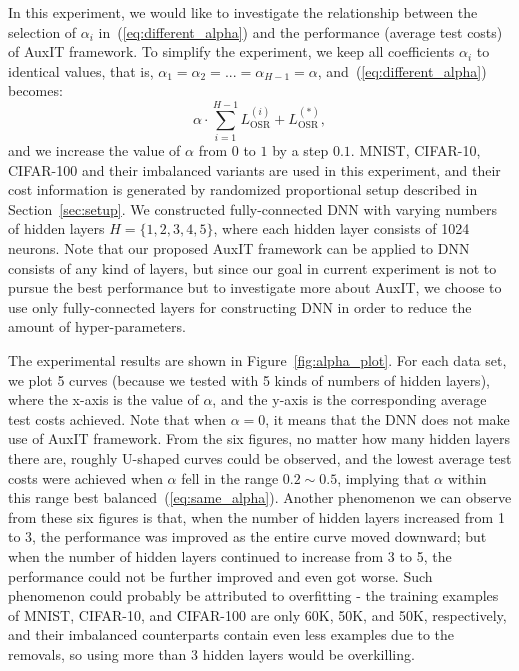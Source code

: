 \documentclass[a4paper]{article}
\begin{document}
  In this experiment, we would like to investigate the relationship between the selection of $\alpha_{i}$ in~(\ref{eq:different_alpha}) and the performance (average test costs) of AuxIT framework.
  To simplify the experiment, we keep all coefficients $\alpha_{i}$ to identical values, that is, $\alpha_{1} = \alpha_{2} = ... = \alpha_{H - 1} = \alpha$, and~(\ref{eq:different_alpha}) becomes:
  \begin{equation}
    \label{eq:same_alpha}
    \alpha \cdot \sum^{H - 1}_{i = 1} L^{(i)}_{\mathrm{OSR}} + L^{(*)}_{\mathrm{OSR}},
  \end{equation}
  and we increase the value of $\alpha$ from $0$ to $1$ by a step $0.1$.
  MNIST, CIFAR-10, CIFAR-100 and their imbalanced variants are used in this experiment, and their cost information is generated by randomized proportional setup described in Section~\ref{sec:setup}.
  We constructed fully-connected DNN with varying numbers of hidden layers $H = \{1, 2, 3, 4, 5\}$, where each hidden layer consists of 1024 neurons.
  Note that our proposed AuxIT framework can be applied to DNN consists of any kind of layers, but since our goal in current experiment is not to pursue the best performance but to investigate more about AuxIT, we choose to use only fully-connected layers for constructing DNN in order to reduce the amount of hyper-parameters.

  The experimental results are shown in Figure~\ref{fig:alpha_plot}.
  For each data set, we plot 5 curves (because we tested with 5 kinds of numbers of hidden layers), where the x-axis is the value of $\alpha$, and the y-axis is the corresponding average test costs achieved.
  Note that when $\alpha = 0$, it means that the DNN does not make use of AuxIT framework.
  From the six figures, no matter how many hidden layers there are, roughly U-shaped curves could be observed, and the lowest average test costs were achieved when $\alpha$ fell in the range $0.2 \sim 0.5$, implying that $\alpha$ within this range best balanced~(\ref{eq:same_alpha}).
  Another phenomenon we can observe from these six figures is that, when the number of hidden layers increased from 1 to 3, the performance was improved as the entire curve moved downward; but when the number of hidden layers continued to increase from 3 to 5, the performance could not be further improved and even got worse.
  Such phenomenon could probably be attributed to overfitting - the training examples of MNIST, CIFAR-10, and CIFAR-100 are only 60K, 50K, and 50K, respectively, and their imbalanced counterparts contain even less examples due to the removals, so using more than 3 hidden layers would be overkilling.
\end{document}
